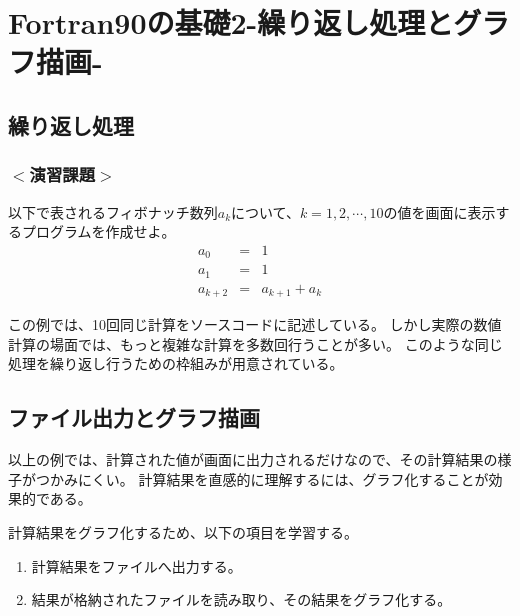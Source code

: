 \documentclass[a4j]{jsbook}
\begin{document}

\chapter{Fortran90の基礎2-繰り返し処理とグラフ描画-}
\section{繰り返し処理}
\subsection*{$<$演習課題$>$}
以下で表されるフィボナッチ数列$a_k$について、$k=1,2, \cdots, 10$の値を画面に表示するプログラムを作成せよ。 \\
\begin{eqnarray}
a_0 &=& 1 \\
a_1 &=& 1 \\
a_{k+2} &=& a_{k+1} + a_k
\end{eqnarray}

この例では、10回同じ計算をソースコードに記述している。
しかし実際の数値計算の場面では、もっと複雑な計算を多数回行うことが多い。
このような同じ処理を繰り返し行うための枠組みが用意されている。




%

\section{ファイル出力とグラフ描画}
以上の例では、計算された値が画面に出力されるだけなので、その計算結果の様子がつかみにくい。
計算結果を直感的に理解するには、グラフ化することが効果的である。

計算結果をグラフ化するため、以下の項目を学習する。
\begin{enumerate}
	\item 計算結果をファイルへ出力する。
	\item 結果が格納されたファイルを読み取り、その結果をグラフ化する。
\end{enumerate}
\end{document}

